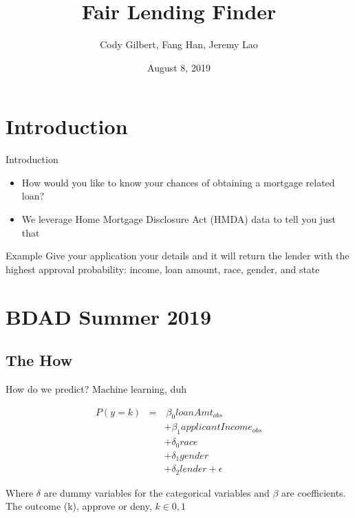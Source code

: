\documentclass{beamer}
\title[Big Mortgage Data]{Fair Lending Finder}
\author{Cody Gilbert, Fang Han, Jeremy Lao}
\institute{NYU Courant, Computer Science}
\date{August 8, 2019}
\begin{document}
\begin{frame}
  \titlepage
\end{frame}


\section{Introduction}

\begin{frame}{Introduction}

\begin{itemize}
  \item How would you like to know your chances of obtaining a mortgage related loan? 
  \item We leverage Home Mortgage Disclosure Act (HMDA) data to tell you just that
\end{itemize}

\vskip 0.5cm

\begin{block}{Example}
Give your application your details and it will return the lender with the highest approval probability: income, loan amount, race, gender, and state
\end{block}

\end{frame}

\section{BDAD Summer 2019}

\subsection{The How}

\begin{frame}{How do we predict? Machine learning, duh}

\begin{eqnarray*}
P(y=k) & = & \ \beta_0 loanAmt_{obs}  \\
& &  + \beta_1 applicantIncome_{obs} \\
& & + \delta_0 race  \\ 
& &  + \delta_1 gender \\
& & +  \delta_2 lender + \epsilon
\end{eqnarray*}


Where $\delta$ are dummy variables for the categorical variables and $\beta$ are coefficients. The outcome (k), approve or deny, $k \in 0,1$

\end{frame}
\end{document}

